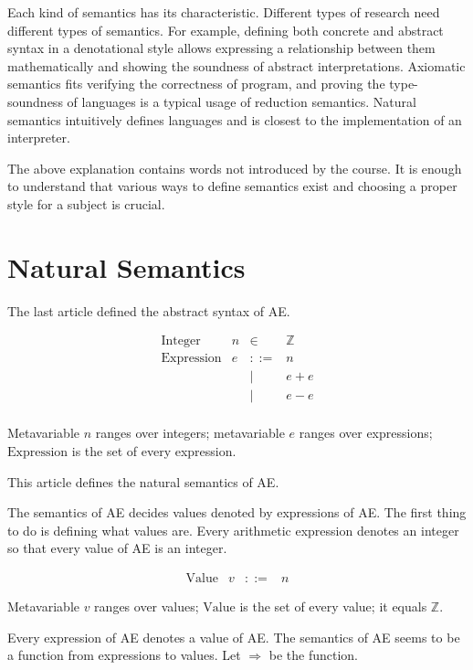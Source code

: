 Each kind of semantics has its characteristic. Different types of research
need different types of semantics. For example, defining both concrete and
abstract syntax in a denotational style allows expressing a relationship
between them mathematically and showing the soundness of abstract
interpretations. Axiomatic semantics fits verifying the correctness of program,
and proving the type-soundness of languages is a typical usage of reduction
semantics. Natural semantics intuitively defines languages and is closest to
the implementation of an interpreter.

The above explanation contains words not introduced by the course. It is
enough to understand that various ways to define semantics exist and choosing
a proper style for a subject is crucial.

\section{Natural Semantics}

The last article defined the abstract syntax of AE.

\[
\begin{array}{lrcl}
\text{Integer} & n & \in & \mathbb{Z} \\
\text{Expression} & e & ::= & n \\
&& | & e+e \\
&& | & e-e \\
\end{array}
\]

Metavariable \(n\) ranges over integers; metavariable \(e\) ranges over
expressions; \(\text{Expression}\) is the set of every expression.

This article defines the natural semantics of AE.

The semantics of AE decides values denoted by expressions of AE. The first
thing to do is defining what values are. Every arithmetic expression denotes
an integer so that every value of AE is an integer.

\[
\begin{array}{lrcl}
\text{Value} & v & ::= & n
\end{array}
\]

Metavariable \(v\) ranges over values; \(\text{Value}\) is the set of every
value; it equals \(\mathbb{Z}\).

Every expression of AE denotes a value of AE. The semantics of AE seems to be
a function from expressions to values. Let \(\Rightarrow\) be the function.

